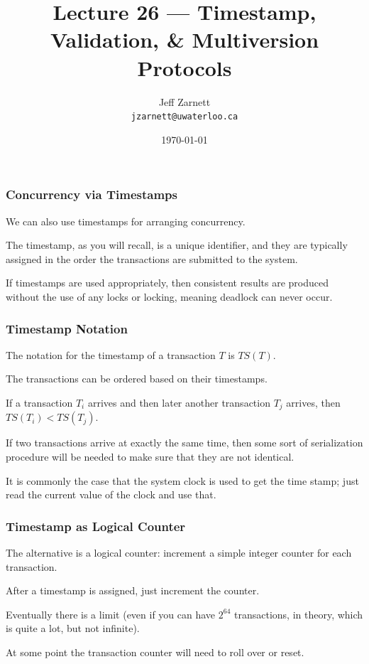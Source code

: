 

\title{Lecture  26 --- Timestamp, Validation, \& Multiversion Protocols }

\author{Jeff Zarnett \\ \small \texttt{jzarnett@uwaterloo.ca}}
\date{\today}




\begin{frame}
  \titlepage

 \end{frame}


\begin{frame}
\frametitle{Concurrency via Timestamps}

We can also use timestamps for arranging concurrency. 

The timestamp, as you will recall, is a unique identifier, and they are typically assigned in the order the transactions are submitted to the system. 

If timestamps are used appropriately, then consistent results are produced without the use of any locks or locking, meaning deadlock can never occur.

\end{frame}

\begin{frame}
\frametitle{Timestamp Notation}
The notation for the timestamp of a transaction $T$ is $T\!S(T)$. 

The transactions can be ordered based on their timestamps. 

If a transaction $T_{i}$ arrives and then later another transaction $T_{j}$ arrives, then $T\!S(T_{i}) < T\!S(T_{j})$. 

If two transactions arrive at exactly the same time, then some sort of serialization procedure will be needed to make sure that they are not identical. 

It is commonly the case that the system clock is used to get the time stamp; just read the current value of the clock and use that.


\end{frame}

\begin{frame}
\frametitle{Timestamp as Logical Counter}

The alternative is a logical counter: increment a simple integer counter for each transaction. 

After a timestamp is assigned, just increment the counter. 

Eventually there is a limit (even if you can have $2^{64}$ transactions, in theory, which is quite a lot, but not infinite).

At some point the transaction counter will need to roll over or reset.

\end{frame}

